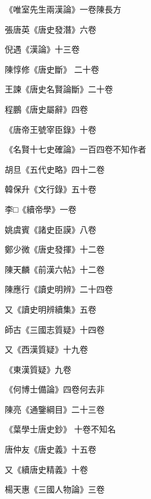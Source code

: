 \begin{pinyinscope}
 《唯室先生兩漢論》一卷陳長方



 張唐英《唐史發潛》六卷



 倪遇《漢論》十三卷



 陳惇修《唐史斷》
 二十卷



 王諫《唐史名賢論斷》二十卷



 程鵬《唐史屬辭》四卷



 《唐帝王號宰臣錄》十卷



 《名賢十七史確論》一百四卷不知作者



 胡旦《五代史略》四十二卷



 韓保升《文行錄》五十卷



 李□《續帝學》一卷



 姚虞賓《諸史臣謨》八卷



 鄭少微《唐史發揮》十二卷



 陳天麟《前漢六帖》十二卷



 陳應行《讀史明辨》二十四卷



 又《讀史明辨續集》五卷



 師古《三國志質疑》十四卷



 又《西漢質疑》十九卷



 《東漢質疑》九卷



 《何博士備論》四卷何去非



 陳亮《通鑒綱目》二十三卷



 《葉學士唐史鈔》
 十卷不知名



 唐仲友《唐史義》十五卷



 又《續唐史精義》十卷



 楊天惠《三國人物論》三卷




\end{pinyinscope}
